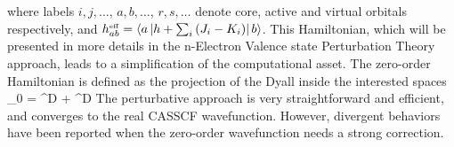   
\eeqa
where labels $i,j,\ldots$, $a,b,\ldots$, $r,s,\ldots$ denote core, active and
virtual orbitals respectively, and $ h_{ab}^{\mbox{\tiny eff}} =
\left\langle a \left| h+\sum_{i}\left( J_i - K_i \right) \right| b \right\rangle$.
This Hamiltonian, which will be presented in more details in the n-Electron
Valence state Perturbation Theory approach, leads to a simplification of the
computational asset. The zero-order Hamiltonian is defined as the projection
of the Dyall inside the interested spaces
\beq
\ham_{0} =  \ham^D  +
 \ham^D 
\eeq
The perturbative approach is very straightforward and efficient, and
converges to the real CASSCF wavefunction. However, divergent behaviors 
have been reported when the zero-order wavefunction needs a strong
correction.


